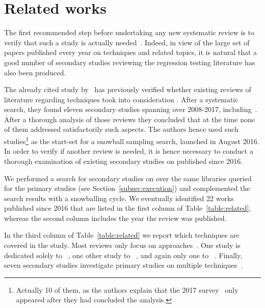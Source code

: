 \section{Related works}\label{sec:lit_related}

The first recommended step before undertaking any new systematic review is to verify that such a study is actually needed~\cite{kitchenham2004procedures}.
Indeed, in view of the large set of papers published every year on \rt techniques and related topics, it is natural that a good number of secondary studies reviewing the regression testing literature has also been produced.  

The already cited study by~\citet{bin_ali_search_2019} has previously verified whether existing reviews of literature regarding \rt techniques took into consideration \rea.
After a systematic search, they found eleven secondary studies spanning over 2008-2017, including~\cite{rosero_15_2016,felderer2015systematic,engstrom2010systematic,zarrad2015systematic,kazmi_effective_2017,harrold2008retesting,catal2012application,yoo2012regression,qiu2014regression,singh2012systematic,catal2013test}. After a thorough analysis of those reviews they concluded that at the time none of them addressed satisfactorily such aspects.
The authors hence used such studies\footnote{Actually 10 of them, as the authors explain that the 2017 survey~\cite{kazmi_effective_2017} only appeared after they had concluded the analysis.} as the start-set for a snowball sampling search, launched in August 2016.  
In order to verify if another review is needed, it is hence necessary to conduct a thorough examination of existing secondary studies on \rt published since 2016.

We performed a search for secondary studies on \rt over the same libraries queried for the primary studies (see Section~\ref{subsec:execution}) and complemented the search results with a snowballing cycle.
We eventually identified 
22 works published since 2016 that are listed in the first column of Table~\ref{table:related}, whereas the
second column includes the year the review was published.




In the third column of Table~\ref{table:related} we report which \rt techniques are covered in the study.
Most reviews only focus on \tcp approaches~\cite{hao_test-case_2016, mukherjee_survey_2018, lou_survey_2018, khatibsyarbini_test_2018, bajaj_systematic_2019, prado_lima_test_2020, hasnain_comprehensive_2020,abdul2021systematic,hasnain2021ontology,mohd2021model,samad2021regression,ahmed_value_2022}.
One study is dedicated solely to \tcs~\cite{kazmi_effective_2017}, one other study to \tsr~\cite{rehman_khan_systematic_2018}, and again only one to \tsa~\cite{danglot2019snowballing}.
Finally, seven secondary studies investigate primary studies on multiple \rt techniques~\cite{rosero_15_2016, do_recent_2016, bajaj_survey_2018, bin_ali_search_2019,sadri2022survey,rosero2021software,pan2022test}.

